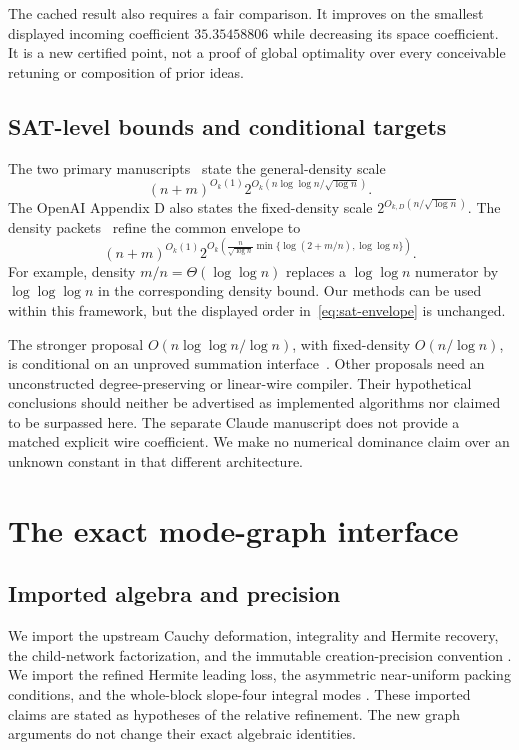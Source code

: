 \documentclass[11pt,letterpaper]{article}
\theoremstyle{remark}\newtheorem{remark}[theorem]{Remark}
\begin{document}
The cached result also requires a fair comparison. It improves on the
smallest displayed incoming coefficient $35.35458806$ while decreasing
its space coefficient. It is a new certified point, not a proof of global
optimality over every conceivable retuning or composition of prior ideas.

\subsection{SAT-level bounds and conditional targets}
The two primary manuscripts~\cite{upstream,claude} state the general-density scale
\[
 (n+m)^{O_k(1)}2^{O_k(n\log\log n/\sqrt{\log n})}.
\]
The OpenAI Appendix D also states the fixed-density scale
$2^{O_{k,D}(n/\sqrt{\log n})}$. The density packets~\cite{densityprior} refine the common
envelope to
\begin{equation}\label{eq:sat-envelope}
 (n+m)^{O_k(1)}
 2^{O_k\left(\frac n{\sqrt{\log n}}
 \min\{\log(2+m/n),\log\log n\}\right)}.
\end{equation}
For example, density $m/n=\Theta(\log\log n)$ replaces a
$\log\log n$ numerator by $\log\log\log n$ in the corresponding
density bound. Our methods can be used within this framework, but the
displayed order in~\eqref{eq:sat-envelope} is unchanged.

The stronger proposal $O(n\log\log n/\log n)$, with fixed-density
$O(n/\log n)$, is conditional on an unproved summation interface~\cite{precisionprior}.
Other proposals need an unconstructed degree-preserving or linear-wire
compiler. Their hypothetical conclusions should neither be advertised
as implemented algorithms nor claimed to be surpassed here.
The separate Claude manuscript does not provide a matched explicit
wire coefficient. We make no numerical dominance claim over an unknown
constant in that different architecture.

\section{The exact mode-graph interface}
\label{sec:imports}

\subsection{Imported algebra and precision}
We import the upstream Cauchy deformation, integrality and Hermite recovery,
the child-network factorization, and the immutable creation-precision
convention \cite{upstream}. We import the refined Hermite leading loss,
the asymmetric near-uniform packing conditions, and the whole-block
slope-four integral modes \cite{asymmetric,joint,incomingadaptive}.
These imported claims are stated as hypotheses of the relative refinement.
The new graph arguments do not change their exact algebraic identities.
\end{document}
